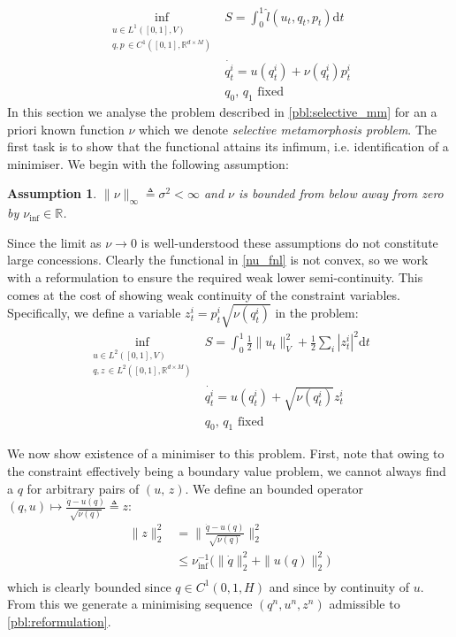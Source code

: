 \documentclass{article}
\newtheorem{assumption}{Assumption}
\newcommand{\half}{\frac 12}
\newcommand{\norm}[2]{\| #1 \|_{ #2 }}
\newcommand{\vnorm}[1]{\norm{ #1 }{V}}
\newcommand{\ltwonorm}[1]{\norm{ #1 }{2}}
\newcommand{\diff}[1]{\text{d} #1}
\newcommand{\RdM}{\mathbb{R}^{d\times M}}
\newcommand{\nuinf}{\nu_\text{inf}}
\begin{document}
\begin{subequations}\label{pbl:selective_mm}
\begin{align}
\inf_{\substack{u \in L^1([0,1],V)\\ q, p\, \in C^1([0,1],\RdM)}} & S = \int_0^1 \hat l(u_t, q_t, p_t)\diff{t}\label{nu_fnl}\\
& \dot{q_t^i} =  u(q_t^i) + \nu(q^i_t)p^i_t \\
    & q_0,\,q_1\text{ fixed}
\end{align}
\end{subequations}
In this section we analyse the problem described in \eqref{pbl:selective_mm} for
an a priori known function $\nu$ which we denote \emph{selective metamorphosis
problem}. The first task is to show that the functional attains its infimum,
i.e. identification of a minimiser. We begin with the following assumption:
\begin{assumption}\label{assumption:nu_bounded}
$\|\nu\|_\infty \triangleq \sigma^2 <\infty$ and $\nu$ is bounded from below
away from zero by $\nuinf \in \mathbb R$.
\end{assumption}
Since the limit as $\nu\rightarrow 0$ is well-understood these assumptions do
not constitute large concessions. Clearly the functional in \eqref{nu_fnl} is
not convex, so we work with a reformulation to ensure the required weak lower
semi-continuity. This comes at the cost of showing weak continuity of the
constraint variables. Specifically, we define a variable $z^i_t = p^i_t
\sqrt{\nu(q_t^i)}$ in the problem:
\begin{subequations}\label{pbl:reformulation}
\begin{align}
\inf_{\substack{u \in L^2([0,1],V)\\ q, z\, \in L^2([0,1],\RdM)}}
    & S = \int_0^1 \half\vnorm{u_t}^2 + \half\sum_i |z_t^i|^2 \diff{t}\\
    & \dot{q_t^i} = u(q_t^i) + \sqrt{\nu(q_t^i)} z^i_t\\
    & q_0,\,q_1\text{ fixed}
\end{align}
\end{subequations}

We now show existence of a minimiser to this problem. First, note that owing to
the constraint effectively being a boundary value problem, we cannot always find
a $q$ for arbitrary pairs of $(u,\,z)$. We define an bounded operator $(q,u)\mapsto
\frac{\dot{q} - u(q)}{\sqrt{\nu(q)}} \triangleq z$:
\begin{align*}
\ltwonorm{z}^2 & = \ltwonorm{\frac{\dot{q} - u(q)}{\sqrt{\nu(q)}}}^2\\
& \leq \nuinf^{-1}\Big(\ltwonorm{\dot{q}}^2 + \ltwonorm{u(q)}^2\Big)\\
\end{align*}
which is clearly bounded since $q\in C^1(0,1,H)$ and since by continuity of $u$.
From this we generate a minimising sequence $(q^n, u^n, z^n)$ admissible to
\eqref{pbl:reformulation}.\\
\end{document}
